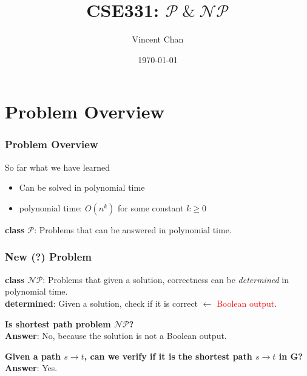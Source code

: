 \documentclass[t]{beamer}
\begin{document}
    \author{Vincent Chan}
    \title{CSE331: $\mathcal{P}\ \&\ \mathcal{NP}$}
    \date{\today}


    \begin{frame}
        \titlepage
    \end{frame}


    \section{Problem Overview}
        \begin{frame}
            \frametitle{Problem Overview}
            \begin{block}{So far what we have learned}
                \begin{itemize}
                    \item<1-> Can be solved in polynomial time
                    \item<2-> polynomial time: $O(n^k)$ for some constant $k \geq 0$
                \end{itemize}
            \end{block}

             \textbf{class $\mathcal{P}$}: Problems that can be answered in polynomial time.
        \end{frame}

        \begin{frame}
            \frametitle{New (?) Problem}
             \textbf{class $\mathcal{NP}$}: Problems that given a solution, correctness can be \textit{determined} in polynomial time.\\
             \textbf{determined}: Given a solution, check if it is correct $\leftarrow$ \textcolor{red}{Boolean output}.

            \bigskip
             \textbf{Is shortest path problem $\mathcal{NP}$?}\\
             \textbf{Answer}: No, because the solution is not a Boolean output.

            \bigskip
             \textbf{Given a path $s \to t$, can we verify if it is the shortest path $s \to t$ in G?}\\
             \textbf{Answer}: Yes.
        \end{frame}
\end{document}
